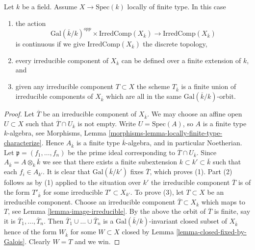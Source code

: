 \begin{lemma}
\label{lemma-galois-action-irreducible-components-locally-finite-type}
Let $k$ be a field.
Assume $X \to \text{Spec}(k)$ locally of finite type.
In this case
\begin{enumerate}
\item the action
$$
\text{Gal}(\overline{k}/k)^{opp} \times \text{IrredComp}(X_{\overline{k}})
\longrightarrow
\text{IrredComp}(X_{\overline{k}})
$$
is continuous if we give $\text{IrredComp}(X_{\overline{k}})$ the discrete
topology,
\item every irreducible component of $X_{\overline{k}}$
can be defined over a finite extension of $k$, and
\item given any irreducible component $T \subset X$ the scheme
$T_{\overline{k}}$ is a finite union of irreducible components of
$X_{\overline{k}}$ which are all in the same
$\text{Gal}(\overline{k}/k)$-orbit.
\end{enumerate}
\end{lemma}

\begin{proof}
Let $\overline{T}$ be an irreducible component of $X_{\overline{k}}$.
We may choose an affine open $U \subset X$ such that
$\overline{T} \cap U_{\overline{k}}$ is not empty.
Write $U = \text{Spec}(A)$, so $A$ is a finite type $k$-algebra, see
Morphisms, Lemma \ref{morphisms-lemma-locally-finite-type-characterize}.
Hence $A_{\overline{k}}$ is a finite type $\overline{k}$-algebra,
and in particular Noetherian. Let $\mathfrak p = (f_1, \ldots, f_n)$
be the prime ideal corresponding to $\overline{T} \cap U_{\overline{k}}$.
Since $A_{\overline{k}} = A \otimes_k \overline{k}$
we see that there exists a finite subextension
$k \subset k' \subset \overline{k}$ such that each $f_i \in A_{k'}$.
It is clear that $\text{Gal}(\overline{k}/k')$
fixes $\overline{T}$, which proves (1). Part (2) follows as
by (1) applied to the situation over $k'$ the irreducible component
$\overline{T}$ is of the form $T'_{\overline{k}}$ for some
irreducible $T' \subset X_{k'}$.
To prove (3), let $T \subset X$ be an irreducible component.
Choose an irreducible component $\overline{T} \subset X_{\overline{k}}$
which maps to $T$, see
Lemma \ref{lemma-image-irreducible}.
By the above the orbit of $\overline{T}$ is finite, say it is
$\overline{T}_1, \ldots, \overline{T}_n$. Then
$\overline{T}_1 \cup \ldots \cup \overline{T}_n$
is a $\text{Gal}(\overline{k}/k)$-invariant closed subset of $X_{\overline{k}}$
hence of the form $W_{\overline{k}}$ for some $W \subset X$ closed by
Lemma \ref{lemma-closed-fixed-by-Galois}.
Clearly $W = T$ and we win.
\end{proof}











